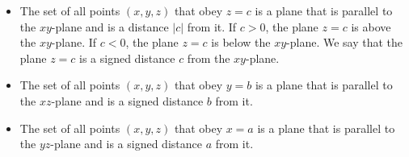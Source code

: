 \begin{itemize}\itemsep1pt \parskip0pt 
\item The set of all points $(x,y,z)$ that obey $z=c$ is a plane
that is parallel to the $xy$-plane and is a distance $|c|$ from it. 
If $c>0$, the plane $z=c$ is above the $xy$-plane.
If $c<0$, the plane $z=c$ is below the $xy$-plane.
We say that the plane $z=c$ is a signed distance $c$ from the
$xy$-plane.

\item The set of all points $(x,y,z)$ that obey $y=b$ is a plane
that is parallel to the $xz$-plane and is a signed distance $b$ from it. 

\item The set of all points $(x,y,z)$ that obey $x=a$ is a plane
that is parallel to the $yz$-plane and is a signed distance $a$ from it. 
\end{itemize}
